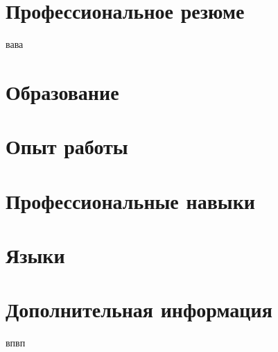 \documentclass[11pt,a4paper,sans]{moderncv}
\begin{document}
\makecvtitle

\section{Профессиональное резюме}
вава

\section{Образование}

\section{Опыт работы}

\section{Профессиональные навыки}

\section{Языки}
\section{Дополнительная информация}
впвп
\end{document}
